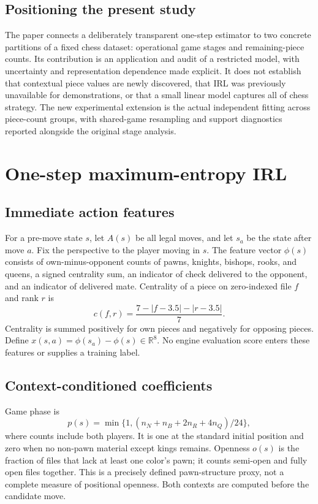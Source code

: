 \documentclass{jcst}
\begin{document}
\subsection{Positioning the present study}
The paper connects a deliberately transparent one-step estimator to two concrete partitions of a fixed chess dataset: operational game stages and remaining-piece counts. Its contribution is an application and audit of a restricted model, with uncertainty and representation dependence made explicit. It does not establish that contextual piece values are newly discovered, that IRL was previously unavailable for demonstrations, or that a small linear model captures all of chess strategy. The new experimental extension is the actual independent fitting across piece-count groups, with shared-game resampling and support diagnostics reported alongside the original stage analysis.
\section{One-step maximum-entropy IRL}
\subsection{Immediate action features}
For a pre-move state $s$, let $A(s)$ be all legal moves, and let $s_a$ be the state after move $a$. Fix the perspective to the player moving in $s$. The feature vector $\phi(s)$ consists of own-minus-opponent counts of pawns, knights, bishops, rooks, and queens, a signed centrality sum, an indicator of check delivered to the opponent, and an indicator of delivered mate. Centrality of a piece on zero-indexed file $f$ and rank $r$ is
\begin{equation}
c(f,r)=\frac{7-|f-3.5|-|r-3.5|}{7}.
\end{equation}
Centrality is summed positively for own pieces and negatively for opposing pieces. Define $x(s,a)=\phi(s_a)-\phi(s)\in\mathbb R^8$. No engine evaluation score enters these features or supplies a training label.

\subsection{Context-conditioned coefficients}
Game phase is
\begin{equation}
p(s)=\min\{1,(n_N+n_B+2n_R+4n_Q)/24\},
\end{equation}
where counts include both players. It is one at the standard initial position and zero when no non-pawn material except kings remains. Openness $o(s)$ is the fraction of files that lack at least one color's pawn; it counts semi-open and fully open files together. This is a precisely defined pawn-structure proxy, not a complete measure of positional openness. Both contexts are computed before the candidate move.
\end{document}

